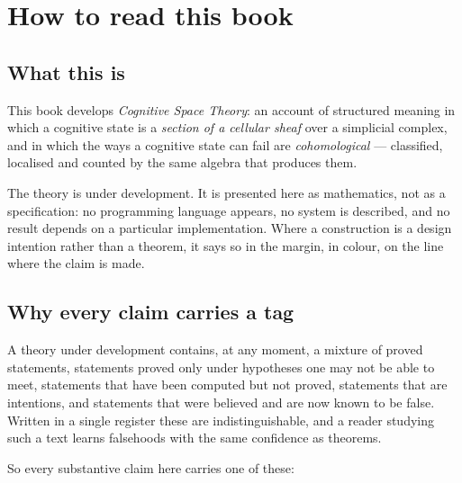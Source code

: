 \chapter*{How to read this book}

\section*{What this is}

This book develops \emph{Cognitive Space Theory}: an account of structured
meaning in which a cognitive state is a \emph{section of a cellular sheaf}
over a simplicial complex, and in which the ways a cognitive state can fail
are \emph{cohomological} --- classified, localised and counted by the same
algebra that produces them.

The theory is under development. It is presented here as mathematics, not as
a specification: no programming language appears, no system is described, and
no result depends on a particular implementation. Where a construction is a
design intention rather than a theorem, it says so in the margin, in colour,
on the line where the claim is made.

\section*{Why every claim carries a tag}

A theory under development contains, at any moment, a mixture of proved
statements, statements proved only under hypotheses one may not be able to
meet, statements that have been computed but not proved, statements that are
intentions, and statements that were believed and are now known to be false.
Written in a single register these are indistinguishable, and a reader
studying such a text learns falsehoods with the same confidence as theorems.

So every substantive claim here carries one of these:

